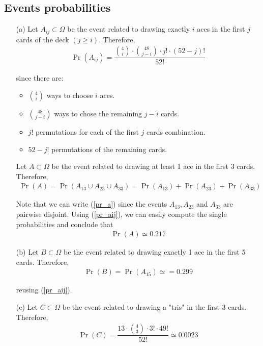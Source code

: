 \subsection{Events probabilities}
\begin{itemize}
	\item[(a)] Let $A_{ij} \subset \Omega$ be the event related to drawing exactly $i$ aces in the first $j$ cards of the deck $(j \geq i)$. Therefore,
	\begin{align}
		\Pr(A_{ij}) = \dfrac{\binom{4}{i} \cdot \binom{48}{j-i} \cdot j! \cdot (52-j)!}{52!} \label{pr_aij}
	\end{align}
	
	\newpage
	since there are:
	\begin{itemize}
		\item $\binom{4}{i}$ ways to choose $i$ aces.
		\item $\binom{48}{j-i}$ ways to chose the remaining $j-i$ cards.
		\item $j!$ permutations for each of the first $j$ cards combination.
		\item $52-j!$ permutations of the remaining cards.
	\end{itemize}
	
	Let $A \subset \Omega$ be the event related to drawing at least 1 ace in the first 3 cards. Therefore,
	\begin{align}
		\Pr(A) = \Pr(A_{13} \cup A_{23} \cup A_{33}) = \Pr(A_{13}) + \Pr(A_{23}) + \Pr(A_{33}) \label{pr_a}
	\end{align}
	
	Note that we can write (\ref{pr_a}) since the events $A_{13}, A_{23}$ and $A_{33}$ are pairwise disjoint. Using (\ref{pr_aij}), we can easily compute the single probabilities and conclude that
	\begin{align*}
		\Pr(A) \simeq 0.217
	\end{align*}
	
	\item[(b)] Let $B \subset \Omega$ be the event related to drawing exactly 1 ace in the first 5 cards. Therefore,
	\begin{align*}
		\Pr(B) = \Pr(A_{15}) \simeq= 0.299
	\end{align*}
	
	reusing (\ref{pr_aij}).
	
	\item[(c)] Let $C \subset \Omega$ be the event related to drawing a "tris" in the first 3 cards. Therefore,
	\begin{align*}
		\Pr(C) = \dfrac{13 \cdot \binom{4}{3} \cdot 3! \cdot 49!}{52!} \simeq 0.0023
	\end{align*}
	

\end{itemize}
